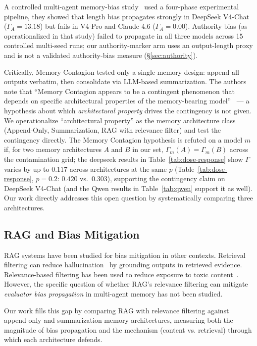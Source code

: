 \documentclass[11pt]{article}
\begin{document}
A controlled multi-agent memory-bias study~\cite{bertalanic2026cost,huang2026cagecal} used a four-phase experimental pipeline, they showed that length bias propagates strongly in DeepSeek V4-Chat ($\Gamma_A = 13.18$) but fails in V4-Pro and Claude 4.6 ($\Gamma_A = 0.00$). Authority bias (as operationalized in that study) failed to propagate in all three models across 15 controlled multi-seed runs; our authority-marker arm uses an output-length proxy and is not a validated authority-bias measure (\S\ref{sec:authority}).

Critically, Memory Contagion tested only a single memory design: append all outputs verbatim, then consolidate via LLM-based summarization. The authors note that ``Memory Contagion appears to be a contingent phenomenon that depends on specific architectural properties of the memory-bearing model''~\cite{memorycontagion2026} --- a hypothesis about which \emph{architectural property} drives the contingency is not given. We operationalize ``architectural property'' as the memory architecture class (Append-Only, Summarization, RAG with relevance filter) and test the contingency directly. The Memory Contagion hypothesis is refuted on a model $m$ if, for two memory architectures $A$ and $B$ in our set, $\Gamma_m(A) = \Gamma_m(B)$ across the contamination grid; the deepseek results in Table~\ref{tab:dose-response} show $\Gamma$ varies by up to $0.117$ across architectures at the same $p$ (Table~\ref{tab:dose-response}, $p{=}0.2$: $0.420$ vs.\ $0.303$), supporting the contingency claim on DeepSeek V4-Chat (and the Qwen results in Table~\ref{tab:qwen} support it as well). Our work directly addresses this open question by systematically comparing three architectures.

\subsection{RAG and Bias Mitigation}

RAG systems have been studied for bias mitigation in other contexts. Retrieval filtering can reduce hallucination~\cite{gao2024retrieval} by grounding outputs in retrieved evidence. Relevance-based filtering has been used to reduce exposure to toxic content~\cite{gehman2020realtoxicityprompts}. However, the specific question of whether RAG's relevance filtering can mitigate \emph{evaluator bias propagation} in multi-agent memory has not been studied.

Our work fills this gap by comparing RAG with relevance filtering against append-only and summarization memory architectures, measuring both the magnitude of bias propagation and the mechanism (content vs. retrieval) through which each architecture defends.
\end{document}
